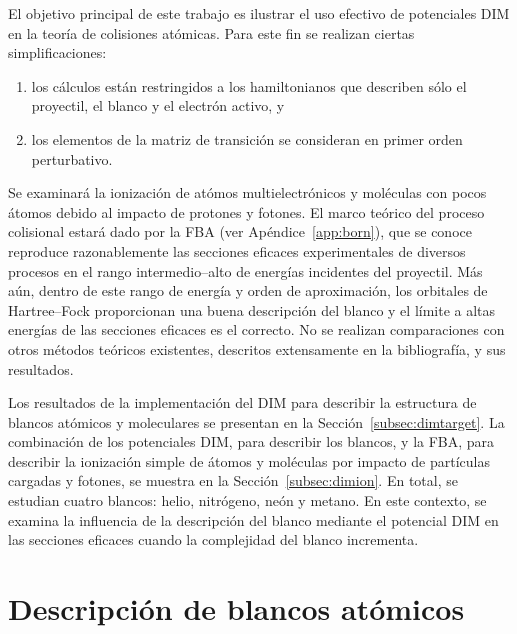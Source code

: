 El objetivo principal de este trabajo es ilustrar el uso efectivo de 
potenciales DIM en la teoría de colisiones atómicas. Para este fin 
se realizan ciertas simplificaciones: 
\begin{enumerate}
\item los cálculos están restringidos a los hamiltonianos que describen
sólo el proyectil, el blanco y el electrón activo, y
\item los elementos de la matriz de transición se consideran en primer 
orden perturbativo.
\end{enumerate}
Se examinará la ionización de atómos multielectrónicos y moléculas con 
pocos átomos debido al impacto de protones y fotones. El marco teórico 
del proceso colisional estará dado por la FBA (ver 
Apéndice~\ref{app:born}), que se conoce reproduce razonablemente las 
secciones eficaces experimentales de diversos procesos en el rango 
intermedio--alto de energías incidentes del proyectil. Más aún, dentro 
de este rango de energía y orden de aproximación, los orbitales de 
Hartree--Fock proporcionan una buena descripción del blanco y el límite 
a altas energías de las secciones eficaces es el correcto. No se 
realizan comparaciones con otros métodos teóricos existentes, 
descritos extensamente en la bibliografía, y sus resultados. 

Los resultados de la implementación del DIM para describir la estructura 
de blancos atómicos y moleculares se presentan en la 
Sección~\ref{subsec:dimtarget}. La combinación de los potenciales DIM, 
para describir los blancos, y la FBA, para describir la ionización 
simple de átomos y moléculas por impacto de partículas cargadas y 
fotones, se muestra en la Sección~\ref{subsec:dimion}. En total, se 
estudian cuatro blancos: helio, nitrógeno, neón y metano. En este 
contexto, se examina la influencia de la descripción del blanco mediante 
el potencial DIM en las secciones eficaces cuando la complejidad del 
blanco incrementa.

\section{Descripción de blancos atómicos}
\label{sec:atomos}

